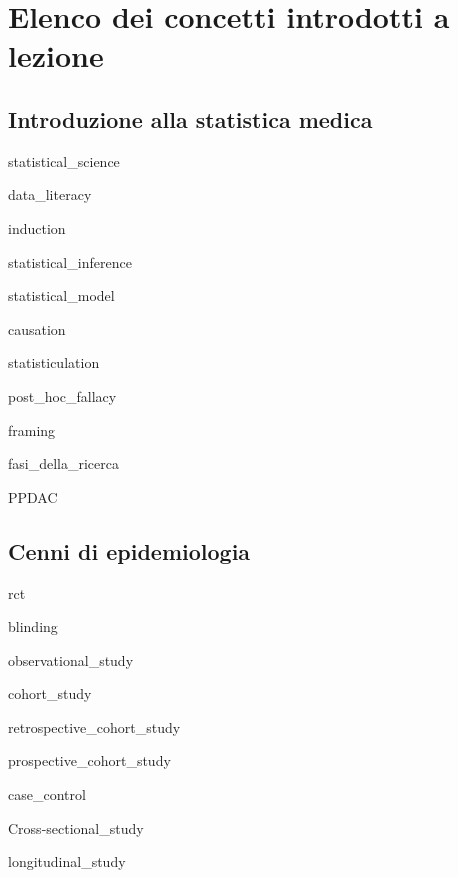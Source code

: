 \documentclass{report}
\begin{document}
\fancyhf{}
\fancyfoot[C]{}
\pagestyle{fancy}

\printnoidxglossary[sort=letter, title={Glossario}]

\newpage



\section*{Elenco dei concetti introdotti a lezione}


\subsection*{Introduzione alla statistica medica}

\gls{statistical_science}

\noindent \gls{data_literacy}

\noindent \gls{induction}

\noindent \gls{statistical_inference}

\noindent \gls{statistical_model}

\noindent \gls{causation}

\noindent \gls{statisticulation}

\noindent \gls{post_hoc_fallacy}

\noindent \gls{framing}

\noindent \gls{fasi_della_ricerca}

\noindent \gls{PPDAC}



\subsection*{Cenni di epidemiologia}

\noindent \gls{rct}

\noindent \gls{blinding}

\noindent \gls{observational_study}

\noindent \gls{cohort_study}

\noindent \gls{retrospective_cohort_study}

\noindent \gls{prospective_cohort_study}

\noindent \gls{case_control}

\noindent \gls{Cross-sectional_study}

\noindent \gls{longitudinal_study}
\end{document}
